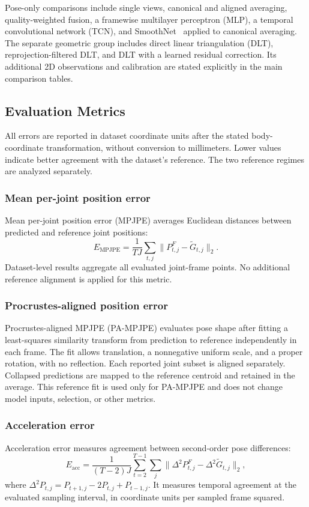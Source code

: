 \documentclass[preprint,12pt]{elsarticle}
\begin{document}
Pose-only comparisons include single views, canonical and aligned averaging, quality-weighted fusion, a framewise multilayer perceptron (MLP), a temporal convolutional network (TCN), and SmoothNet~\cite{zeng2022smoothnet} applied to canonical averaging. The separate geometric group includes direct linear triangulation (DLT), reprojection-filtered DLT, and DLT with a learned residual correction. Its additional 2D observations and calibration are stated explicitly in the main comparison tables.

\subsection{Evaluation Metrics}

All errors are reported in dataset coordinate units after the stated body-coordinate transformation, without conversion to millimeters. Lower values indicate better agreement with the dataset's reference. The two reference regimes are analyzed separately.

\subsubsection{Mean per-joint position error}
Mean per-joint position error (MPJPE) averages Euclidean distances between predicted and reference joint positions:
\[
E_{\mathrm{MPJPE}}=\frac{1}{TJ}\sum_{t,j}\|P^F_{t,j}-\tilde{G}_{t,j}\|_2.
\]
Dataset-level results aggregate all evaluated joint-frame points. No additional reference alignment is applied for this metric.

\subsubsection{Procrustes-aligned position error}
Procrustes-aligned MPJPE (PA-MPJPE) evaluates pose shape after fitting a least-squares similarity transform from prediction to reference independently in each frame. The fit allows translation, a nonnegative uniform scale, and a proper rotation, with no reflection. Each reported joint subset is aligned separately. Collapsed predictions are mapped to the reference centroid and retained in the average. This reference fit is used only for PA-MPJPE and does not change model inputs, selection, or other metrics.

\subsubsection{Acceleration error}
Acceleration error measures agreement between second-order pose differences:
\[
E_{\mathrm{acc}}=\frac{1}{(T-2)J}\sum_{t=2}^{T-1}\sum_j
\|\Delta^2 P^F_{t,j}-\Delta^2\tilde{G}_{t,j}\|_2,
\]
where \(\Delta^2 P_{t,j}=P_{t+1,j}-2P_{t,j}+P_{t-1,j}\). It measures temporal agreement at the evaluated sampling interval, in coordinate units per sampled frame squared.
\end{document}
